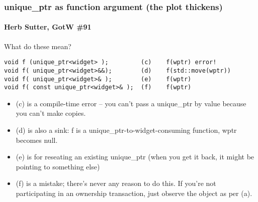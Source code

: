 \begin{frame}[fragile]
\frametitle{unique\_ptr as function argument (the plot thickens)}
\framesubtitle{Herb Sutter, GotW \#91}

What do these mean?

{\scriptsize\begin{verbatim}
void f (unique_ptr<widget> );         (c)    f(wptr) error!
void f( unique_ptr<widget>&&);        (d)    f(std::move(wptr))
void f( unique_ptr<widget>& );        (e)    f(wptr)
void f( const unique_ptr<widget>& );  (f)    f(wptr)
\end{verbatim}}

\begin{itemize}
\item (c) is a compile-time error -- you can't pass a unique\_ptr by
  value because you can't make copies.
\item (d) is also a sink:  f is a unique\_ptr-to-widget-consuming
  function, wptr becomes null.
\pause{}
\item (e) is for reseating an existing unique\_ptr (when you get it
  back, it might be pointing to something else)
\pause{}
\item (f) is a mistake; there's never any reason to do this.  If
  you're not participating in an ownership transaction, just observe
  the object as per (a).
\end{itemize}

\end{frame}


